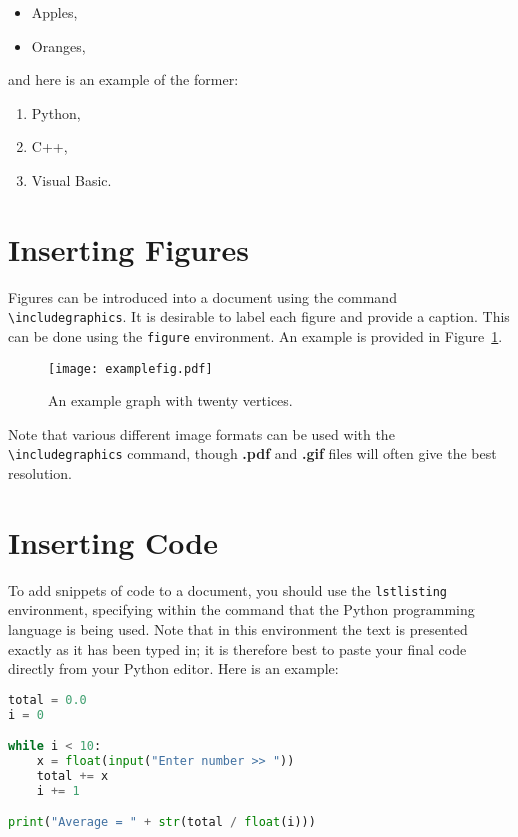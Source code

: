 \documentclass[10pt]{article}
\begin{document}
\begin{itemize}
\item Apples,
\item Oranges,
\end{itemize}

and here is an example of the former:

\begin{enumerate}
\item Python,
\item C++,
\item Visual Basic.
\end{enumerate}


\section{Inserting Figures}

Figures can be introduced into a document using the command \verb|\includegraphics|. It is desirable to label each figure and provide a caption. This can be done using the \texttt{figure} environment. An example is provided in Figure~\ref{fig:graph}.

\begin{figure}
\centering
\texttt{[image: examplefig.pdf]} 
\caption{An example graph with twenty vertices.}
\label{fig:graph}
\end{figure}

Note that various different image formats can be used with the \verb|\includegraphics| command, though \textbf{.pdf} and \textbf{.gif} files will often give the best resolution.


\section{Inserting Code}

To add snippets of code to a document, you should use the \texttt{lstlisting} environment, specifying within the command that the Python programming language is being used. Note that in this environment the text is presented exactly as it has been typed in; it is therefore best to paste your final code directly from your Python editor. Here is an example:
   
\begin{lstlisting}[language = python, frame=single]
total = 0.0
i = 0

while i < 10:
	x = float(input("Enter number >> "))
	total += x
	i += 1

print("Average = " + str(total / float(i)))
\end{lstlisting}
\end{document}
